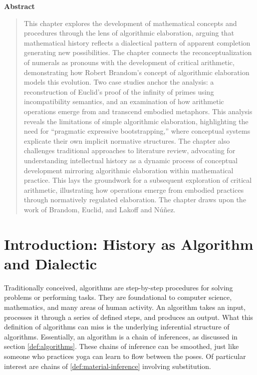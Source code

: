\documentclass[12pt]{book}
\newenvironment{abstract}
    { %
      \begin{center} %
        \textbf{Abstract} %
      \end{center}
      \vspace{\baselineskip} %
      \begin{quotation} %
      \small %
    }
    { %
      \end{quotation} %
      \bigskip %
    }
\begin{document}
\begin{abstract}
This chapter explores the development of mathematical concepts and
procedures through the lens of algorithmic elaboration, arguing that
mathematical history reflects a dialectical pattern of apparent
completion generating new possibilities. The chapter connects the
reconceptualization of numerals as pronouns with the development of
critical arithmetic, demonstrating how Robert Brandom's concept of
algorithmic elaboration models this evolution. Two case studies anchor
the analysis: a reconstruction of Euclid's proof of the infinity of
primes using incompatibility semantics, and an examination of how
arithmetic operations emerge from and transcend embodied metaphors. This
analysis reveals the limitations of simple algorithmic elaboration,
highlighting the need for ``pragmatic expressive bootstrapping,'' where
conceptual systems explicate their own implicit normative structures.
The chapter also challenges traditional approaches to literature review,
advocating for understanding intellectual history as a dynamic process
of conceptual development mirroring algorithmic elaboration within
mathematical practice. This lays the groundwork for a subsequent
exploration of critical arithmetic, illustrating how operations emerge
from embodied practices through normatively regulated elaboration. The
chapter draws upon the work of Brandom, Euclid, and Lakoff and Núñez.

\end{abstract}


\section{Introduction: History as Algorithm and Dialectic}

Traditionally conceived, algorithms are step-by-step procedures for solving problems or performing tasks. They are foundational to computer science, mathematics, and many areas of human activity. An algorithm takes an input, processes it through a series of defined steps, and produces an output. What this definition of algorithms can miss is the underlying inferential structure of algorithms. Essentially, an algorithm is a chain of inferences, as discussed in section \ref{def:algorithms}. These chains of inference can be smoothed, just like someone who practices yoga can learn to flow between the poses. Of particular interest are chains of \ref{def:material-inference} involving substitution. 
\end{document}
